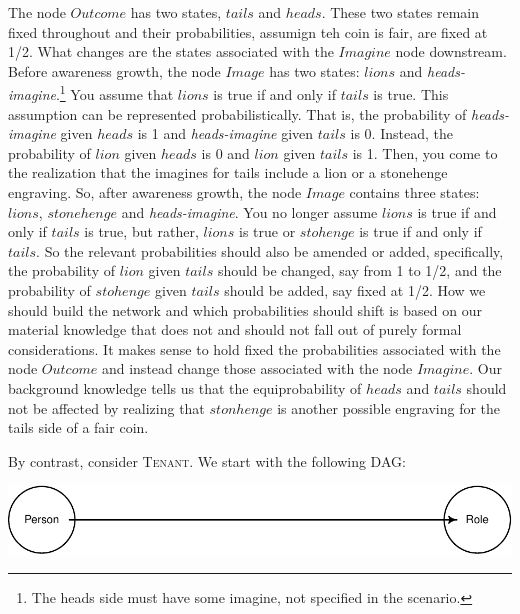 \documentclass[
  11pt,
  dvipsnames,enabledeprecatedfontcommands]{scrartcl}
\begin{document}
\noindent The node \(Outcome\) has two states, \(tails\) and \(heads\).
These two states remain fixed throughout and their probabilities,
assumign teh coin is fair, are fixed at 1/2. What changes are the states
associated with the \(Imagine\) node downstream. Before awareness
growth, the node \(Image\) has two states: \(lions\) and
\textit{heads-imagine}.\footnote{The heads side must have some imagine,
  not specified in the scenario.} You assume that \(lions\) is true if
and only if \(tails\) is true. This assumption can be represented
probabilistically. That is, the probability of \textit{heads-imagine}
given \(heads\) is 1 and \textit{heads-imagine} given \(tails\) is 0.
Instead, the probability of \(lion\) given \(heads\) is 0 and \(lion\)
given \(tails\) is 1. Then, you come to the realization that the
imagines for tails include a lion or a stonehenge engraving. So, after
awareness growth, the node \(Image\) contains three states: \(lions\),
\(stonehenge\) and \textit{heads-imagine}. You no longer assume
\(lions\) is true if and only if \(tails\) is true, but rather,
\(lions\) is true or \(stohenge\) is true if and only if \(tails\). So
the relevant probabilities should also be amended or added,
specifically, the probability of \(lion\) given \(tails\) should be
changed, say from 1 to 1/2, and the probability of \(stohenge\) given
\(tails\) should be added, say fixed at 1/2. How we should build the
network and which probabilities should shift is based on our material
knowledge that does not and should not fall out of purely formal
considerations. It makes sense to hold fixed the probabilities
associated with the node \(Outcome\) and instead change those associated
with the node \(Imagine\). Our background knowledge tells us that the
equiprobability of \(heads\) and \(tails\) should not be affected by
realizing that \(stonhenge\) is another possible engraving for the tails
side of a fair coin.

By contrast, consider \textsc{Tenant}. We start with the following DAG:

\begin{center}\includegraphics[width=0.5\linewidth,height=0.3\textheight]{ReplyToSteeleStefansson2_files/figure-latex/tenantsDAG-1} \end{center}
\end{document}
